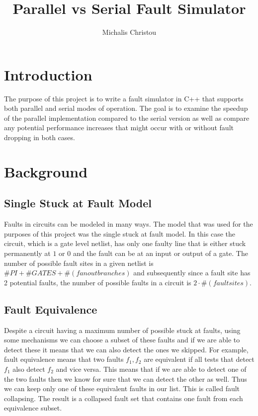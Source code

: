 \documentclass[a4paper,12pt]{article}
\author{Michalis Christou}
\title{Parallel vs Serial Fault Simulator}
\begin{document}
\maketitle

\section*{Introduction}
The purpose of this project is to write a fault simulator in C++ that supports both parallel and serial modes of operation. The goal is to examine the speedup of the parallel implementation compared to the serial version as well as compare any potential performance increases that might occur with or without fault dropping in both cases.


\section*{Background}
\subsection*{Single Stuck at Fault Model}
Faults in circuits can be modeled in many ways. The model that was used for the purposes of this project was the single stuck at fault model. In this case the circuit, which is a gate level netlist, has only one faulty line that is either stuck permanently at $1$ or $0$ and the fault can be at an input or output of a gate. The number of possible fault sites in a given netlist is $\# PI + \#GATES + \#(fanout branches)$ and subsequently since a fault site has 2 potential faults, the number of possible faults in a circuit is $2 \cdot \#(fault sites)$. 

\subsection*{Fault Equivalence}
Despite a circuit having a maximum number of possible stuck at faults, using some mechanisms we can choose a subset of these faults and if we are able to detect these it means that we can also detect the ones we skipped. For example, fault equivalence means that two faults $f_1, f_2$ are equivalent if all tests that detect $f_1$ also detect $f_2$ and vice versa. This means that if we are able to detect one of the two faults then we know for sure that we can detect the other as well. Thus we can keep only one of these equivalent faults in our list. This is called fault collapsing. The result is a collapsed fault set that contains one fault from each equivalence subset.
\end{document}
